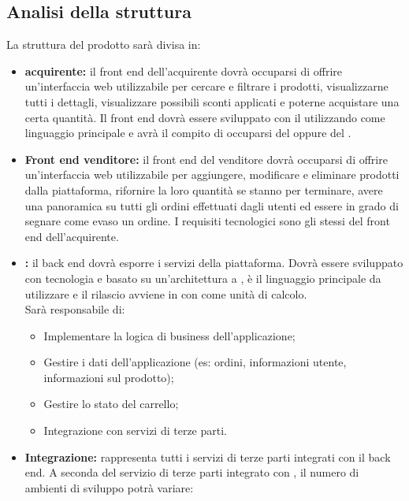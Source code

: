 \subsection{Analisi della struttura}
La struttura del prodotto sarà divisa in:
\begin{itemize}
    \item \textbf{ acquirente:} il front end dell'acquirente dovrà occuparsi di offrire un'interfaccia web utilizzabile per cercare e filtrare i prodotti, visualizzarne tutti i dettagli, visualizzare possibili sconti applicati e poterne acquistare una certa quantità. Il front end dovrà essere sviluppato con il   utilizzando come linguaggio principale  e avrà il compito di occuparsi del  oppure del .
    \item \textbf{Front end venditore:} il front end del venditore dovrà occuparsi di offrire un'interfaccia web utilizzabile per aggiungere, modificare e eliminare prodotti dalla piattaforma, rifornire la loro quantità se stanno per terminare, avere una panoramica su tutti gli ordini effettuati dagli utenti ed essere in grado di segnare come evaso un ordine. I requisiti tecnologici sono gli stessi del front end dell'acquirente.
    \item \textbf{:} il back end dovrà esporre i servizi della piattaforma. Dovrà essere sviluppato con tecnologia  e basato su un'architettura a ,  è il linguaggio principale da utilizzare e il rilascio avviene in  con  come unità di calcolo.\\
    Sarà responsabile di:
    \begin{itemize}
        \item Implementare la logica di business dell'applicazione;
        \item Gestire i dati dell'applicazione (es: ordini, informazioni utente, informazioni sul prodotto);
        \item Gestire lo stato del carrello;
        \item Integrazione con servizi di terze parti.
    \end{itemize}
    \item \textbf{Integrazione:} rappresenta tutti i servizi di terze parti integrati con il back end. A seconda del servizio di terze parti integrato con \NomeProgetto{}, il numero di ambienti di sviluppo potrà variare:
    \begin{itemize}

\end{itemize}
\end{itemize}
